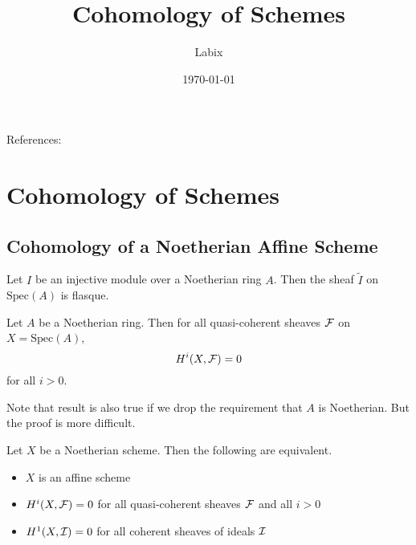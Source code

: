 \documentclass[a4paper]{article}
\title{Cohomology of Schemes}
\author{Labix}
\date{\today}
\begin{document}
\maketitle
\begin{abstract}
\end{abstract}

References: 
\begin{itemize}

\end{itemize}
\pagebreak
\tableofcontents

\pagebreak
\section{Cohomology of Schemes}
\subsection{Cohomology of a Noetherian Affine Scheme}
\begin{prp}{}{} Let $I$ be an injective module over a Noetherian ring $A$. Then the sheaf $\tilde{I}$ on $\text{Spec}(A)$ is flasque. 
\end{prp}

\begin{thm}{}{} Let $A$ be a Noetherian ring. Then for all quasi-coherent sheaves $\mathcal{F}$ on $X=\text{Spec}(A)$, $$H^i(X,\mathcal{F})=0$$ for all $i>0$. 
\end{thm}

Note that result is also true if we drop the requirement that $A$ is Noetherian. But the proof is more difficult. 

\begin{thm}{}{} Let $X$ be a Noetherian scheme. Then the following are equivalent. 
\begin{itemize}
\item $X$ is an affine scheme
\item $H^i(X,\mathcal{F})=0$ for all quasi-coherent sheaves $\mathcal{F}$ and all $i>0$
\item $H^1(X,\mathcal{I})=0$ for all coherent sheaves of ideals $\mathcal{I}$
\end{itemize}
\end{thm}
\end{document}
